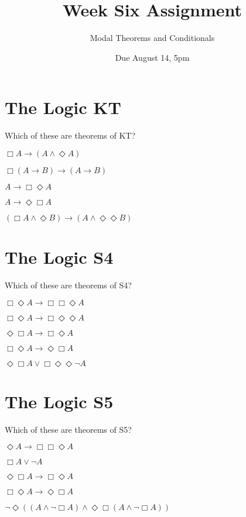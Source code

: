 \title{Week Six Assignment}
\author{Modal Theorems and Conditionals}
\date{Due August 14, 5pm}


\section*{The Logic KT}
Which of these are theorems of KT?

\begin{enumerate*}
\setcounter{enumi}{0}
\item $\Box A \rightarrow (A \wedge \Diamond A)$
\item $\Box (A \rightarrow B) \rightarrow (A \rightarrow B)$
\item $A \rightarrow \Box \Diamond A$
\item $A \rightarrow \Diamond \Box A$
\item $(\Box A \wedge \Diamond B) \rightarrow (A \wedge \Diamond \Diamond B)$
\end{enumerate*}

\section*{The Logic S4}
Which of these are theorems of S4?

\begin{enumerate*}
\setcounter{enumi}{5}
\item $\Box \Diamond A \rightarrow \Box \Box \Diamond A$
\item $\Box \Diamond A \rightarrow \Box \Diamond \Diamond A$
\item $\Diamond \Box A \rightarrow \Box \Diamond A$
\item $\Box \Diamond A \rightarrow \Diamond \Box A$
\item $\Diamond \Box A \vee \Box \Diamond \Diamond \neg A$
\end{enumerate*}

\section*{The Logic S5}
Which of these are theorems of S5?
\begin{enumerate*}
\setcounter{enumi}{10}
\item $\Diamond A \rightarrow \Box \Box \Diamond A$
\item $\Box A \vee \neg A$
\item $\Diamond \Box A \rightarrow \Box \Diamond A$
\item $\Box \Diamond A \rightarrow \Diamond \Box A$
\item $\neg \Diamond ((A \wedge \neg \Box A) \wedge \Diamond \Box (A \wedge \neg \Box A))$
\end{enumerate*}

